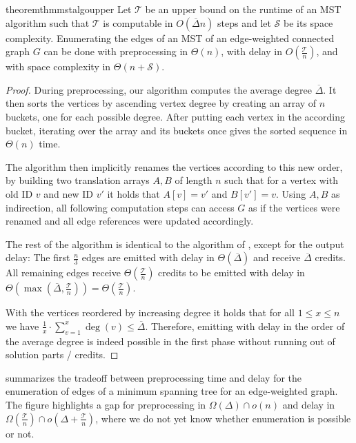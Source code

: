 \documentclass[a4paper, USenglish, cleveref, autoref, thm-restate]{lipics-v2021}
\newcommand{\maxdeg}{\Delta}
\newcommand{\avgdeg}{\overline{\Delta}}
\newcommand{\totaltime}{\mathcal{T}}
\newcommand{\totalspace}{\mathcal{S}}
\begin{document}
\begin{restatable}{theorem}{thmmstalgoupper}
	\label{thm:mst-algo-upper}
	Let $\totaltime$ be an upper bound on the runtime of an MST algorithm such that $\totaltime$ is computable in $O(\avgdeg n)$ steps and let $\totalspace$ be its space complexity.
	Enumerating the edges of an MST of an edge-weighted connected graph $G$ can be done with preprocessing in $\Theta(n)$, with delay in $O(\frac{\totaltime}{n})$, and with space complexity in $\Theta(n + \totalspace)$.
\end{restatable}
\begin{proof}
	During preprocessing, our algorithm computes the average degree $\avgdeg$.
	It then sorts the vertices by ascending vertex degree by creating an array of $n$ buckets, one for each possible degree.
	After putting each vertex in the according bucket, iterating over the array and its buckets once gives the sorted sequence in $\Theta(n)$ time.
	
	The algorithm then implicitly renames the vertices according to this new order, by building two translation arrays $A, B$ of length $n$ such that for a vertex with old ID $v$ and new ID $v'$ it holds that $A[v] = v'$ and $B[v'] = v$.
	Using $A, B$ as indirection, all following computation steps can access $G$ as if the vertices were renamed and all edge references were updated accordingly.
	
	The rest of the algorithm is identical to the algorithm of , except for the output delay:
	The first $\frac{n}{3}$ edges are emitted with delay in $\Theta(\avgdeg)$ and receive $\avgdeg$ credits.
	All remaining edges receive $\Theta(\frac{\totaltime}{n})$ credits to be emitted with delay in $\Theta(\max(\avgdeg, \frac{\totaltime}{n})) = \Theta(\frac{\totaltime}{n})$.
	
	With the vertices reordered by increasing degree it holds that for all $1 \leq x \leq n$ we have
	\(\frac{1}{x} \cdot \sum_{v = 1}^{x} \deg(v) \leq \avgdeg\).
	Therefore, emitting with delay in the order of the average degree is indeed possible in the first phase without running out of solution parts / credits.
\end{proof}

 summarizes the tradeoff between preprocessing time and delay for the enumeration of edges of a minimum spanning tree for an edge-weighted graph.
The figure highlights a gap for preprocessing in $\Omega(\maxdeg) \cap o(n)$ and delay in $\Omega(\frac{\totaltime}{n}) \cap o(\maxdeg + \frac{\totaltime}{n})$, where we do not yet know whether enumeration is possible or not.
\end{document}
